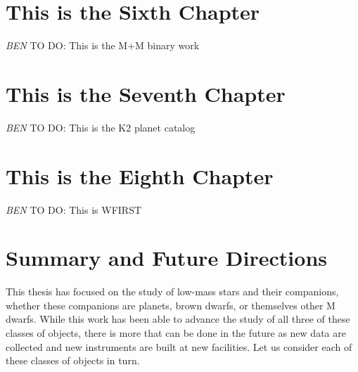 \documentclass[12pt]{caltech_thesis}
\newcommand{\todo}[3]{{\color{#2} \emph{#1} TO DO: #3}}
\newcommand{\btmtodo}[1]{\todo{BEN}{red}{#1}}
\begin{document}
\chapter{This is the Sixth Chapter}
\label{chap:Mbinaries}

\btmtodo{This is the M+M binary work}

\chapter{This is the Seventh Chapter}
\label{chap:k2}

\btmtodo{This is the K2 planet catalog}

\chapter{This is the Eighth Chapter}
\label{chap:wfirst}

\btmtodo{This is WFIRST}

\chapter{Summary and Future Directions}
\label{chap:summary}

This thesis has focused on the study of low-mass stars and their companions,
whether these companions are planets, brown dwarfs, or themselves other M dwarfs.
While this work has been able to advance the study of all three of these classes of
objects, there is more that can be done in the future as new data are collected and new
instruments are built at new facilities.
Let us consider each of these classes of objects in turn.
\end{document}
